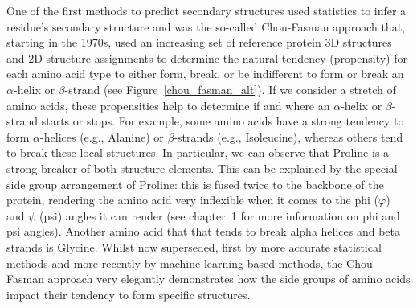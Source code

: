One of the first methods to predict secondary structures used statistics to infer a residue's secondary structure and was the so-called Chou-Fasman approach that, starting in the 1970s, used an increasing set of reference protein 3D structures and 2D structure assignments to determine the natural tendency (propensity) for each amino acid type to either form, break, or be indifferent to form or break an $\alpha$-helix or $\beta$-strand (see Figure~\ref{chou_fasman_alt}).
If we consider a stretch of amino acids, these propensities help to determine if and where an $\alpha$-helix or $\beta$-strand starts or stops.
For example, some amino acids have a strong tendency to form $\alpha$-helices (e.g., Alanine) or $\beta$-strands (e.g., Isoleucine), whereas others tend to break these local structures.
In particular, we can observe that Proline is a strong breaker of both structure elements.
This can be explained by the special side group arrangement of Proline: this is fused twice to the backbone of the protein, rendering the amino acid very inflexible when it comes to the phi ($\varphi$) and $\psi$ (psi) angles it can render (see chapter~1 for more information on phi and psi angles).
Another amino acid that that tends to break alpha helices and beta strands is Glycine.
Whilst now superseded, first by more accurate statistical methods and more recently by machine learning-based methods, the Chou-Fasman approach very elegantly demonstrates how the side groups of amino acids impact their tendency to form specific structures.

% 

